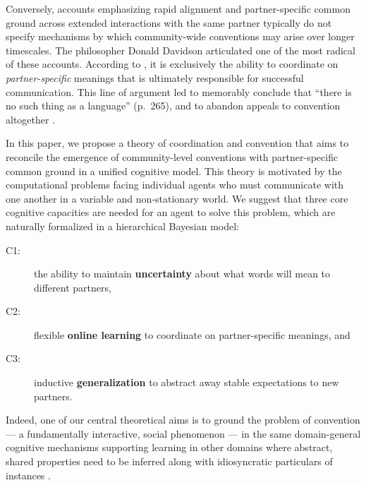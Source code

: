 Conversely, accounts emphasizing rapid alignment \cite{pickering2004toward} and partner-specific common ground \cite{ClarkWilkesGibbs86_ReferringCollaborative} across extended interactions with the same partner typically do not specify mechanisms by which community-wide conventions may arise over longer timescales.
The philosopher Donald Davidson articulated one of the most radical of these accounts.
According to , it is exclusively the ability to coordinate on \emph{partner-specific} meanings that is ultimately responsible for successful communication.
This line of argument led  to memorably conclude that ``there is no such thing as a language'' (p.~265), and to abandon appeals to convention altogether \cite<see also>[for discussion]{heck_idiolect,lepore2007reality,hacking1986nice,dummett1994}.%

In this paper, we propose a theory of coordination and convention that aims to reconcile the emergence of community-level conventions with partner-specific common ground in a unified cognitive model.
This theory is motivated by the computational problems facing individual agents who must communicate with one another in a variable and non-stationary world. 
We suggest that three core cognitive capacities are needed for an agent to solve this problem, which are naturally formalized in a hierarchical Bayesian model:
\begin{description}
\item[C1:] the ability to maintain \textbf{uncertainty} about what words will mean to different partners,
\item[C2:] flexible  \textbf{online learning} to coordinate on partner-specific meanings, and
\item[C3:] inductive \textbf{generalization} to abstract away stable expectations to new partners.
\end{description}
Indeed, one of our central theoretical aims is to ground the problem of convention --- a fundamentally interactive, social phenomenon --- in the same domain-general cognitive mechanisms supporting learning in other domains where abstract, shared properties need to be inferred along with idiosyncratic particulars of instances \cite{berniker2008estimating,GoodmanUllmanTenenbaum11_TheoryOfCausality,tenenbaum_how_2011,kleinschmidt2015robust}.

